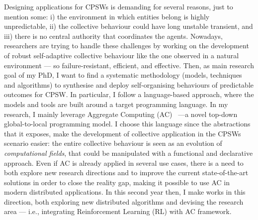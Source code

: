 \documentclass[11pt]{article}
\begin{document}
Designing applications for CPSWs is demanding for several reasons, just to mention some:
 i) the environment in which entities belong is highly unpredictable,
 ii) the collective behaviour could have long unstable transient, and
 iii) there is no central authority that coordinates the agents. 
%
Nowadays, researchers are trying to handle these challenges by working 
 on the development of robust self-adaptive collective behaviour
 like the one observed in a natural environment --- so failure-resistant, efficient, and effective. 
%
Then, as main research goal of my PhD, I want to find a systematic methodology (models, techniques and algorithms) 
 to synthesise and deploy self-organising behaviours of predictable outcomes for CPSW.
%
In particular, I follow a language-based approach, where the models and tools are built around
 a target programming language.
%
In my research, 
 I mainly leverage Aggregate Computing (AC)~\cite{beal2015aggregate} ---a novel top-down global-to-local programming model. 
%
I choose this language since the abstractions that it exposes, 
 make the development of collective application in the CPSWs scenario easier:
 the entire collective behaviour is seen as an evolution of \textit{computational fields},
 that could be manipulated with a functional and declarative approach.
%
Even if AC is already applied in several use cases, 
 there is a need to both explore new research directions and
 to improve the current state-of-the-art solutions in order to close the reality gap, 
 making it possible to use AC in modern distributed applications.
%
In this second year then, 
 I make works in this direction, 
 both exploring new distributed algorithms and devising the research area 
 --- i.e., integrating Reinforcement Learning (RL) with AC framework. 
\end{document}
